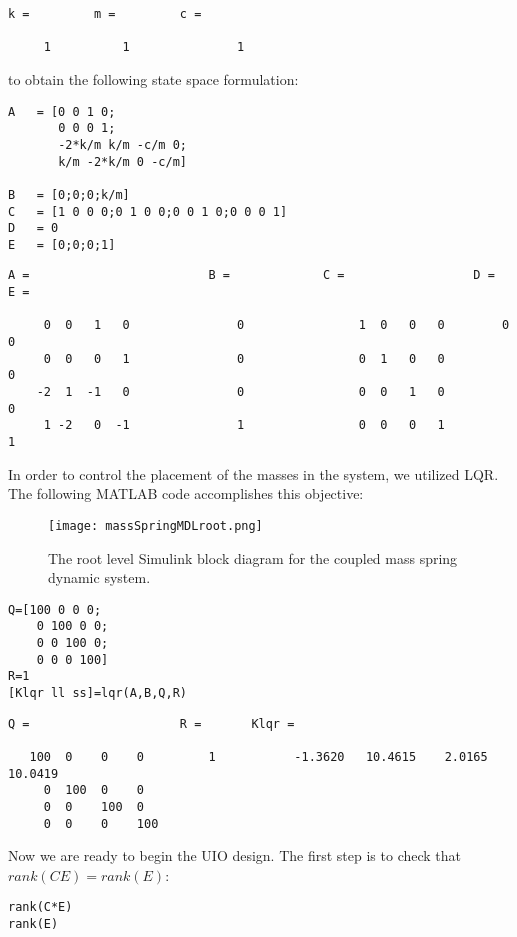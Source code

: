 \documentclass{amsart}
\theoremstyle{definition}
\theoremstyle{remark}
\numberwithin{equation}{section}
\begin{document}
        \color{lightgray} \begin{verbatim}
k =         m =         c = 

     1          1               1

\end{verbatim} \color{black}
to obtain the following state space formulation: \\ 
    \begin{verbatim}
A   = [0 0 1 0;
       0 0 0 1;
       -2*k/m k/m -c/m 0;
       k/m -2*k/m 0 -c/m]

B   = [0;0;0;k/m]
C   = [1 0 0 0;0 1 0 0;0 0 1 0;0 0 0 1]
D   = 0
E   = [0;0;0;1]
\end{verbatim}

        \color{lightgray} \begin{verbatim}
A =                         B =             C =                  D =        E = 

     0  0   1   0               0                1  0   0   0        0              0
     0  0   0   1               0                0  1   0   0                       0
    -2  1  -1   0               0                0  0   1   0                       0
     1 -2   0  -1               1                0  0   0   1                       1

\end{verbatim} \color{black}
In order to control the placement of the masses in the system, we utilized LQR.  The following MATLAB code accomplishes this objective: 

\begin{figure}[H]
    \centering
    \texttt{[image: massSpringMDLroot.png]}
    \caption{The root level Simulink block diagram for the coupled mass spring dynamic system.}
    \label{ex:msMDLroot}
\end{figure}

    \begin{verbatim}
Q=[100 0 0 0;
    0 100 0 0;
    0 0 100 0;
    0 0 0 100]
R=1
[Klqr ll ss]=lqr(A,B,Q,R)
\end{verbatim}

        \color{lightgray} \begin{verbatim}
Q =                     R =       Klqr = 

   100  0    0    0         1           -1.3620   10.4615    2.0165   10.0419
     0  100  0    0
     0  0    100  0
     0  0    0    100

\end{verbatim} \color{black}
Now we are ready to begin the UIO design.  The first step is to check that $rank(CE) = rank(E)$:  
    \begin{verbatim}
rank(C*E)
rank(E)
\end{verbatim}
\end{document}
